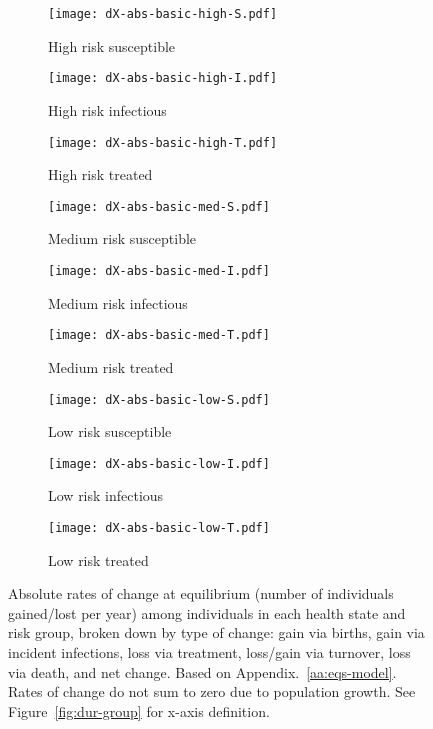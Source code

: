 \begin{figure}[H]
  \centering
  \begin{subfigure}{0.31\linewidth}
    \centering\texttt{[image: dX-abs-basic-high-S.pdf]}
    \caption{High risk susceptible}\label{fig:dX-app-high-S}
  \end{subfigure}
  \begin{subfigure}{0.31\linewidth}
    \centering\texttt{[image: dX-abs-basic-high-I.pdf]}
    \caption{High risk infectious}\label{fig:dX-app-high-I}
  \end{subfigure}
  \begin{subfigure}{0.31\linewidth}
    \centering\texttt{[image: dX-abs-basic-high-T.pdf]}
    \caption{High risk treated}\label{fig:dX-app-high-T}
  \end{subfigure}
  \begin{subfigure}{0.31\linewidth}
    \centering\texttt{[image: dX-abs-basic-med-S.pdf]}
    \caption{Medium risk susceptible}\label{fig:dX-app-med-S}
  \end{subfigure}
  \begin{subfigure}{0.31\linewidth}
    \centering\texttt{[image: dX-abs-basic-med-I.pdf]}
    \caption{Medium risk infectious}\label{fig:dX-app-med-I}
  \end{subfigure}
    \begin{subfigure}{0.31\linewidth}
    \centering\texttt{[image: dX-abs-basic-med-T.pdf]}
    \caption{Medium risk treated}\label{fig:dX-app-med-T}
  \end{subfigure}
  \begin{subfigure}{0.31\linewidth}
    \centering\texttt{[image: dX-abs-basic-low-S.pdf]}
    \caption{Low risk susceptible}\label{fig:dX-abs-low-S}
  \end{subfigure}
  \begin{subfigure}{0.31\linewidth}
    \centering\texttt{[image: dX-abs-basic-low-I.pdf]}
    \caption{Low risk infectious}\label{fig:dX-app-low-I}
  \end{subfigure}
  \begin{subfigure}{0.31\linewidth}
    \centering\texttt{[image: dX-abs-basic-low-T.pdf]}
    \caption{Low risk treated}\label{fig:dX-app-low-T}
  \end{subfigure}
  
  \caption{Absolute rates of change at equilibrium
    (number of individuals gained/lost per year)
    among individuals in each health state and risk group,
    broken down by type of change:
    gain via births,
    gain via incident infections,
    loss via treatment,
    loss/gain via turnover,
    loss via death,
    and net change.
    Based on Appendix.~\ref{aa:eqs-model}.
    Rates of change do not sum to zero due to population growth.
    See Figure~\ref{fig:dur-group} for x-axis definition.}
  \label{fig:dX-app}
\end{figure}
